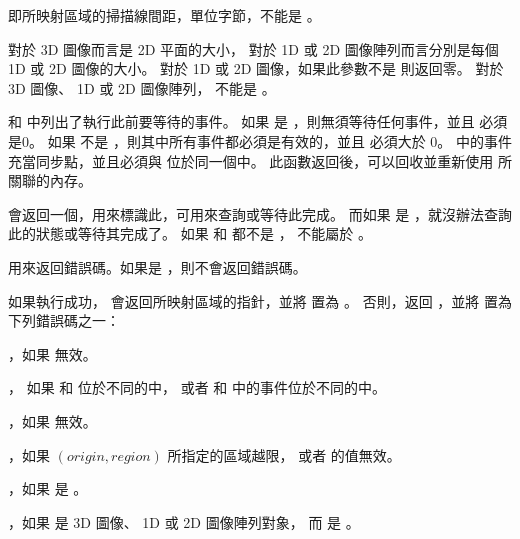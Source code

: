  即所映射區域的掃描線間距，單位字節，不能是 。

 對於 3D 圖像而言是 2D 平面的大小，
對於 1D 或 2D 圖像陣列而言分別是每個 1D 或 2D 圖像的大小。
對於 1D 或 2D 圖像，如果此參數不是  則返回零。
對於 3D 圖像、 1D 或 2D 圖像陣列，  不能是 。

 和  中列出了執行此前要等待的事件。
如果  是 ，則無須等待任何事件，並且  必須是0。
如果  不是 ，則其中所有事件都必須是有效的，並且  必須大於 0。
 中的事件充當同步點，並且必須與  位於同一個中。
此函數返回後，可以回收並重新使用  所關聯的內存。

 會返回一個，用來標識此，可用來查詢或等待此完成。
而如果  是 ，就沒辦法查詢此的狀態或等待其完成了。
如果  和  都不是 ，  不能屬於 。

 用來返回錯誤碼。如果是 ，則不會返回錯誤碼。

如果執行成功，  會返回所映射區域的指針，並將  置為 。
否則，返回 ，並將  置為下列錯誤碼之一：
\startigBase
\item {}，如果  無效。

\item {}，
  如果  和  位於不同的中，
  或者  和  中的事件位於不同的中。

\item {}，如果  無效。

\item {}，如果 $(origin, region)$ 所指定的區域越限，
  或者  的值無效。

\item {}，如果  是 。

\item {}，如果  是 3D 圖像、 1D 或 2D 圖像陣列對象，
  而  是 。

